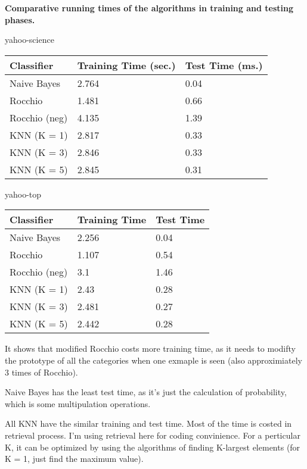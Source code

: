 \documentclass[11pt]{article}
\begin{document}
\hfill

\textbf{Comparative running times of the algorithms in training and testing phases.}

yahoo-science

\begin{tabular}{|l|l|l|}
	\hline
	Classifier & Training Time (sec.) & Test Time (ms.) \\
	\hline
	Naive Bayes & 2.764 & 0.04\\
	\hline
	Rocchio & 1.481 & 0.66 \\
	\hline
	Rocchio (neg) & 4.135 & 1.39 \\
	\hline
	KNN (K = 1) & 2.817 & 0.33 \\
	\hline
	KNN (K = 3) & 2.846 & 0.33 \\
	\hline
	KNN (K = 5) & 2.845 & 0.31 \\
	\hline
\end{tabular}

\hfill

yahoo-top

\begin{tabular}{|l|l|l|}
	\hline
	Classifier & Training Time & Test Time \\
	\hline
	Naive Bayes & 2.256 & 0.04 \\
	\hline
	Rocchio & 1.107 & 0.54 \\
	\hline
	Rocchio (neg) & 3.1 & 1.46 \\
	\hline
	KNN (K = 1) & 2.43 & 0.28 \\
	\hline
	KNN (K = 3) & 2.481 & 0.27 \\
	\hline
	KNN (K = 5) & 2.442 & 0.28 \\
	\hline
\end{tabular}

\hfill

It shows that modified Rocchio costs more training time, as it needs to modifty the prototype of all the categories when one exmaple is seen (also approximiately 3 times of Rocchio).

Naive Bayes has the least test time, as it's just the calculation of probability, which is some multipulation operations.

All KNN have the similar training and test time. Most of the time is costed in retrieval process. I'm using retrieval here for coding convinience. For a perticular K, it can be optimized by using the algorithms of finding K-largest elements (for K = 1, just find the maximum value).
\end{document}
